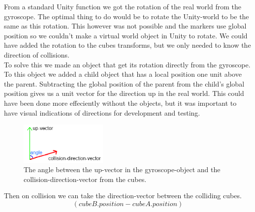 From a standard Unity function we got the rotation of the real world from the gyroscope. The optimal thing to do would be to rotate the Unity-world to be the same as this rotation. This however was not possible and the markers use global position so we couldn't make a virtual world object in Unity to rotate. We could have added the rotation to the cubes transforms, but we only needed to know the direction of collisions. \\
To solve this we made an object that get its rotation directly from the gyroscope. To this object we added a child object that has a local position one unit above the parent. Subtracting the global position of the parent from the child's global position gives us a unit vector for the direction up in the real world. This could have been done more effeciently without the objects, but it was important to have visual indications of directions for development and testing.\\

\begin{figure}
        \capstart
        \centering
        \vspace{-10pt}
        \includegraphics[width=0.38\textwidth]{images/CollisionDirectionAngleModel.png}
        \vspace{-10pt}
        \caption[Model for finding the angle between the vectors]{The angle between the up-vector in the gyroscope-object and the collision-direction-vector from the cubes.}
        \vspace{-10pt}
        \label{fig:Vector_Angle_model}
\end{figure}

Then on collision we can take the direction-vector between the colliding cubes. 
\[
(cubeB.position - cubeA.position)
\]


